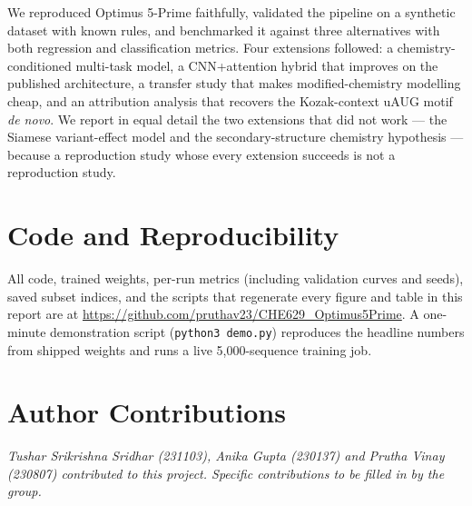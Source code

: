\documentclass{article}
\newcommand{\repourl}{https://github.com/pruthav23/CHE629_Optimus5Prime}
\begin{document}
We reproduced Optimus 5-Prime faithfully, validated the pipeline on a synthetic dataset with
known rules, and benchmarked it against three alternatives with both regression and
classification metrics. Four extensions followed: a chemistry-conditioned multi-task model, a
CNN+attention hybrid that improves on the published architecture, a transfer study that makes
modified-chemistry modelling cheap, and an attribution analysis that recovers the Kozak-context
uAUG motif \emph{de novo}. We report in equal detail the two extensions that did not work ---
the Siamese variant-effect model and the secondary-structure chemistry hypothesis --- because
a reproduction study whose every extension succeeds is not a reproduction study.

\section*{Code and Reproducibility}
All code, trained weights, per-run metrics (including validation curves and seeds), saved
subset indices, and the scripts that regenerate every figure and table in this report are at
\url{\repourl}. A one-minute demonstration script
(\texttt{python3 demo.py}) reproduces the headline numbers from shipped weights and runs a
live 5{,}000-sequence training job.

\section*{Author Contributions}
\textit{Tushar Srikrishna Sridhar (231103), Anika Gupta (230137) and Prutha Vinay (230807)
contributed to this project. Specific contributions to be filled in by the group.}



\end{document}
